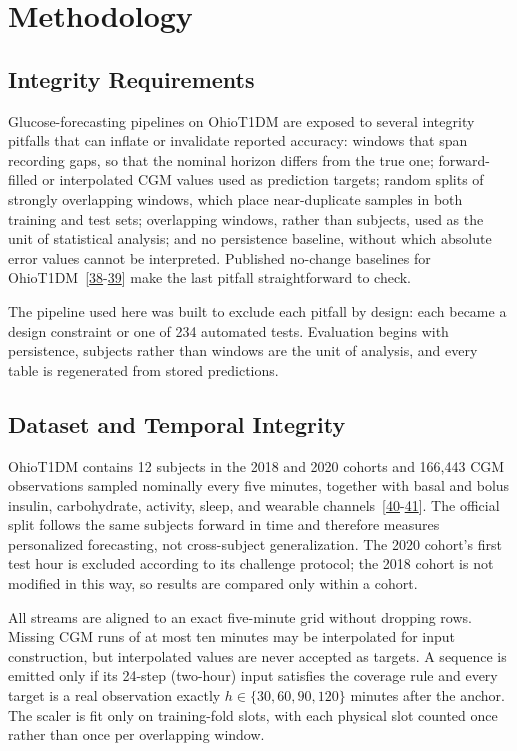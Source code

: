 \documentclass[journal]{IEEEtran}
\begin{document}

\section{Methodology}

\subsection{Integrity Requirements}

Glucose-forecasting pipelines on OhioT1DM are exposed to several integrity pitfalls that can inflate or invalidate reported accuracy: windows that span recording gaps, so that the nominal horizon differs from the true one; forward-filled or interpolated CGM values used as prediction targets; random splits of strongly overlapping windows, which place near-duplicate samples in both training and test sets; overlapping windows, rather than subjects, used as the unit of statistical analysis; and no persistence baseline, without which absolute error values cannot be interpreted. Published no-change baselines for OhioT1DM~[\hyperref[ref56label]{38}-\hyperref[ref57label]{39}] make the last pitfall straightforward to check.

The pipeline used here was built to exclude each pitfall by design: each became a design constraint or one of 234 automated tests. Evaluation begins with persistence, subjects rather than windows are the unit of analysis, and every table is regenerated from stored predictions.

\subsection{Dataset and Temporal Integrity}

OhioT1DM contains 12 subjects in the 2018 and 2020 cohorts and 166,443 CGM observations sampled nominally every five minutes, together with basal and bolus insulin, carbohydrate, activity, sleep, and wearable channels~[\hyperref[ref30label]{40}-\hyperref[ref31label]{41}]. The official split follows the same subjects forward in time and therefore measures personalized forecasting, not cross-subject generalization. The 2020 cohort's first test hour is excluded according to its challenge protocol; the 2018 cohort is not modified in this way, so results are compared only within a cohort.

All streams are aligned to an exact five-minute grid without dropping rows. Missing CGM runs of at most ten minutes may be interpolated for input construction, but interpolated values are never accepted as targets. A sequence is emitted only if its 24-step (two-hour) input satisfies the coverage rule and every target is a real observation exactly $h \in \{30, 60, 90, 120\}$ minutes after the anchor. The scaler is fit only on training-fold slots, with each physical slot counted once rather than once per overlapping window.
\end{document}

